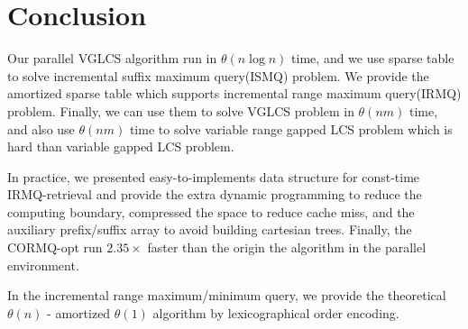 \section{Conclusion}
\label{sec:Conclusion}

Our parallel VGLCS algorithm run in $\theta(n \log n)$ time, and we
use sparse table to solve incremental suffix maximum query(ISMQ)
problem.  We provide the amortized sparse table which supports
incremental range maximum query(IRMQ) problem.  Finally, we can use
them to solve VGLCS problem in $\theta(nm)$ time, and also use
$\theta(nm)$ time to solve variable range gapped LCS problem which is
hard than variable gapped LCS problem.

In practice, we presented easy-to-implements data structure for
const-time IRMQ-retrieval and provide the extra dynamic programming to
reduce the computing boundary, compressed the space to reduce cache
miss, and the auxiliary prefix/suffix array to avoid building
cartesian trees. Finally, the CORMQ-opt run $2.35 \times$ faster than
the origin the algorithm in the parallel environment.

In the incremental range maximum/minimum query, we provide the
theoretical $\theta(n)$ - amortized $\theta(1)$ algorithm by
lexicographical order encoding.

\iffalse
我們修改 VGLCS 的序列算法，將其平行化於 $\theta(n \log n)$ 時間內，
並以稀疏表實作 ISMQ 問題。提出的稀疏表能解決比 VGLCS 更困難的 Variable Range Gapped LCS，
致使 VIGLCS 可在時間複雜度 $\theta(nm)$ 被解決。

在實務上，我們提供以動態規劃減少計算量，以及使用空間壓縮降低快取未中的策略，
最終平行 RMQ 獲取 $2.35 \times$ 倍的加速；在增長區間最大值詢問 (IRMQ) 問題中，
以字典順序的編碼策略，提出理論 $\theta(n)$ -- amortized $\theta(1)$  的算法。
\fi
